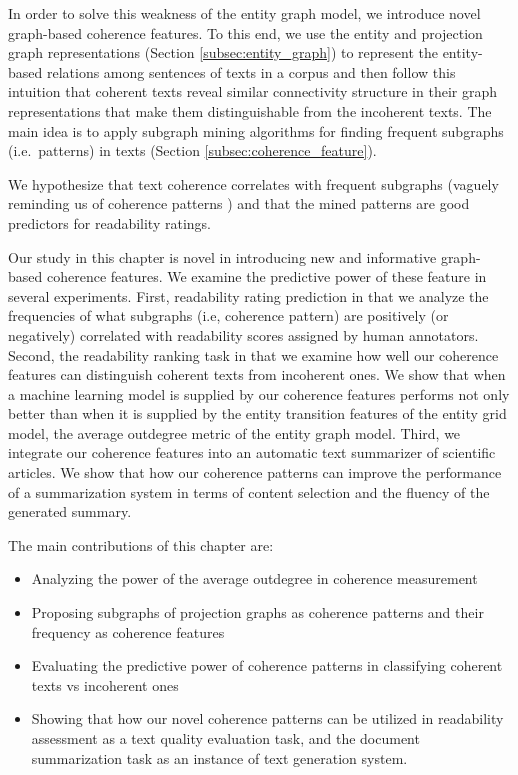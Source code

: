 In order to solve this weakness of the entity graph model, we introduce novel graph-based coherence features. 
To  this end, we use the entity and projection graph representations 
(Section \ref{subsec:entity_graph}) to represent the entity-based relations among sentences of texts in a corpus and then follow this intuition that coherent texts reveal similar connectivity structure in their graph representations that make them distinguishable from the incoherent texts. 
The main idea is to apply subgraph mining algorithms for finding frequent subgraphs (i.e.\ patterns) in texts (Section \ref{subsec:coherence_feature}). 

We hypothesize that text coherence correlates with frequent subgraphs (vaguely reminding us of coherence patterns \cite{danes74a}) and that the mined patterns are good predictors for readability ratings.

Our study in this chapter is novel in introducing new and informative graph-based coherence features. 
We examine the predictive power of these feature in several experiments.  
First, readability rating prediction in that we analyze the frequencies of what subgraphs (i.e, coherence pattern) are positively (or negatively) correlated with readability scores assigned by human annotators. 
Second, the readability ranking task in that we examine how well our coherence features can distinguish coherent texts from incoherent ones. 
We show that when a machine learning model is supplied by our coherence features performs not only better than when it is supplied by the entity transition features of the entity grid model, the average outdegree metric of the entity graph model. 
Third, we integrate our coherence features into an automatic text summarizer of scientific articles. 
We show that how our coherence patterns can improve the performance of a summarization system in terms of content selection and  the fluency of the generated summary. 

The main contributions of this chapter are:

\begin{itemize}
\item Analyzing the power of the average outdegree in coherence measurement
\item Proposing subgraphs of projection graphs as coherence patterns and their frequency as coherence features 
\item Evaluating the predictive power of coherence patterns in classifying coherent texts vs incoherent ones
\item Showing that how our novel coherence patterns can be utilized in readability assessment as a text quality evaluation task, and the document summarization task as an instance of text generation system.   
\end{itemize}

